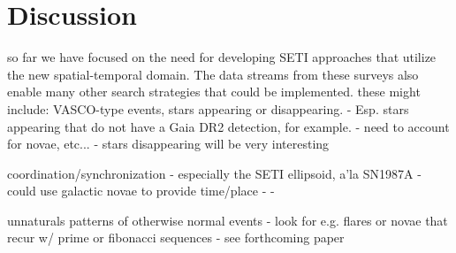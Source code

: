 \documentclass[twocolumn]{aastex62}
\begin{document}




\section{Discussion}
\label{sec:discussion}
%
%
%
%


so far we have focused on the need for developing SETI approaches that utilize the new spatial-temporal domain. The data streams from these surveys also enable many other search strategies that could be implemented. these might include:
VASCO-type events, stars appearing or disappearing. \citep{villarroel2016}
	- Esp. stars appearing that do not have a Gaia DR2 detection, for example.
	- need to account for novae, etc...
	- stars disappearing will be very interesting

coordination/synchronization \citep{makovetskii1977,shostak2004}
        - especially the SETI ellipsoid, a'la SN1987A \citep{lemarchand1994}
        - could use galactic novae to provide time/place
        - %
        - %

unnaturals patterns of otherwise normal events
	- look for e.g. flares or novae that recur w/ prime or fibonacci sequences
	- see forthcoming paper
\end{document}
